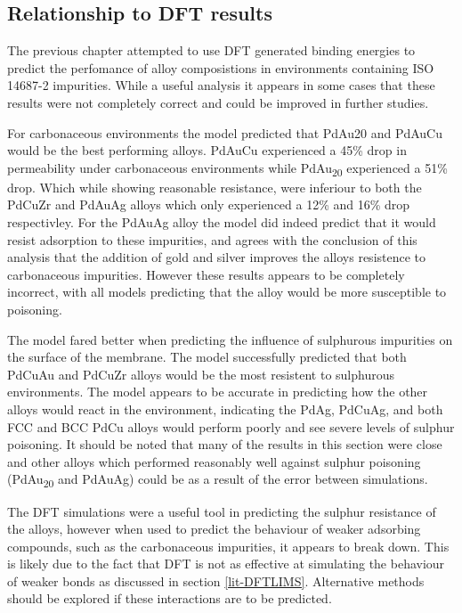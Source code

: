 \subsection{Relationship to DFT results}
The previous chapter attempted to use DFT generated binding energies to predict the perfomance of alloy composistions in environments containing ISO 14687-2 impurities. While a useful analysis it appears in some cases that these results were not completely correct and could be improved in further studies. 

For carbonaceous environments the model predicted that PdAu20 and PdAuCu would be the best performing alloys. PdAuCu experienced a 45\% drop in permeability under carbonaceous environments while PdAu\textsubscript{20} experienced a 51\% drop. Which while showing reasonable resistance, were inferiour to both the PdCuZr and PdAuAg alloys which only experienced a 12\% and 16\% drop respectivley. For the PdAuAg alloy the model did indeed predict that it would resist adsorption to these impurities, and agrees with the conclusion of this analysis that the addition of gold and silver improves the alloys resistence to carbonaceous impurities. However these results appears to be completely incorrect, with all models predicting that the alloy would be more susceptible to poisoning. 

The model fared better when predicting the influence of sulphurous impurities on the surface of the membrane. The model successfully predicted that both PdCuAu and PdCuZr alloys would be the most resistent to sulphurous environments. The model appears to be accurate in predicting how the other alloys would react in the environment, indicating the PdAg, PdCuAg, and both FCC and BCC PdCu alloys would perform poorly and see severe levels of sulphur poisoning. It should be noted that many of the results in this section were close and other alloys which performed reasonably well against sulphur poisoning (PdAu\textsubscript{20} and PdAuAg) could be as a result of the error between simulations. 

The DFT simulations were a useful tool in predicting the sulphur resistance of the alloys, however when used to predict the behaviour of weaker adsorbing compounds, such as the carbonaceous impurities, it appears to break down. This is likely due to the fact that DFT is not as effective at simulating the behaviour of weaker bonds as discussed in section \ref{lit-DFTLIMS}. Alternative methods should be explored if these interactions are to be predicted.

